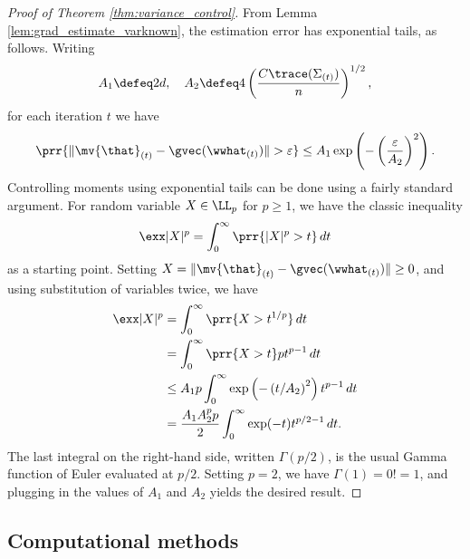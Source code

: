 \documentclass[11pt,oneside]{article}
\theoremstyle{definition} \newtheorem{defn}{Definition}       %
\theoremstyle{plain} \newtheorem{prop}[defn]{Proposition}           %
\theoremstyle{plain} \newtheorem{thm}[defn]{Theorem}                %
\theoremstyle{plain} \newtheorem{lem}[defn]{Lemma}                  %
\theoremstyle{plain} \newtheorem{cor}[defn]{Corollary}              %
\theoremstyle{remark} \newtheorem{rmk}[defn]{Remark}                %
\theoremstyle{remark} \newtheorem{ex}[defn]{Example}                %
\begin{document}
\begin{proof}[Proof of Theorem \ref{thm:variance_control}]
From Lemma \ref{lem:grad_estimate_varknown}, the estimation error has exponential tails, as follows. Writing
%
\begin{align*}
A_{1} \defeq 2d, \quad A_{2} \defeq 4\left(\frac{C\trace(\Sigma_{(t)})}{n}\right)^{1/2},
\end{align*}
%
for each iteration $t$ we have
%
\begin{align*}
\prr\{\|\mv{\that}_{(t)}-\gvec(\wwhat_{(t)})\| > \varepsilon\} \leq A_{1} \exp\left(-\left(\frac{\varepsilon}{A_{2}}\right)^{2}\right).
\end{align*}
%
Controlling moments using exponential tails can be done using a fairly standard argument. For random variable $X \in \LL_{p}$ for $p \geq 1$, we have the classic inequality
%
\begin{align*}
\exx|X|^{p} = \int_{0}^{\infty} \prr\{|X|^{p}>t\}\,dt
\end{align*}
%
as a starting point. Setting $X = \|\mv{\that}_{(t)}-\gvec(\wwhat_{(t)})\| \geq 0$, and using substitution of variables twice, we have
%
\begin{align*}
\exx|X|^{p} & = \int_{0}^{\infty} \prr\{X>t^{1/p}\} \, dt\\
& = \int_{0}^{\infty} \prr\{X > t\}pt^{p-1} \, dt\\
& \leq A_{1}p \int_{0}^{\infty} \exp\left(-\left(t/A_{2}\right)^{2}\right) t^{p-1} \, dt\\
& = \frac{A_{1}A_{2}^{p}p}{2} \int_{0}^{\infty}\exp(-t)t^{p/2-1} \, dt.
\end{align*}
%
The last integral on the right-hand side, written $\Gamma(p/2)$, is the usual Gamma function of Euler evaluated at $p/2$. Setting $p=2$, we have $\Gamma(1)=0!=1$, and plugging in the values of $A_{1}$ and $A_{2}$ yields the desired result.
\end{proof}



\subsection{Computational methods}\label{sec:appendix_computation}
\end{document}
